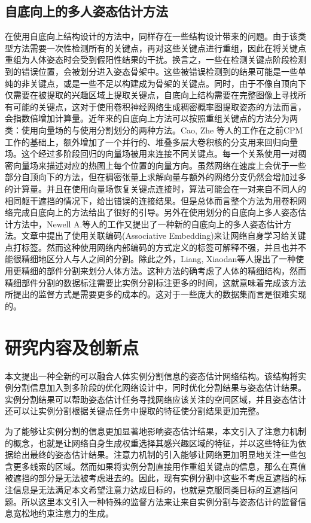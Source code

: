 \subsection{自底向上的多人姿态估计方法}
\label{subsec:bottomup}
在使用自底向上结构设计的方法中，同样存在一些结构设计带来的问题。由于该类型方法需要一次性检测所有的关键点，再对这些关键点进行重组，因此在将关键点重组为人体姿态时会受到假阳性结果的干扰。换言之，一些在检测关键点阶段检测到的错误位置，会被划分进入姿态骨架中。这些被错误检测到的结果可能是一些单纯的非关键点，或是一些不足以构建成为骨架的关键点。同时，由于不像自顶向下仅需要在被提取的兴趣区域上提取关键点，自底向上结构需要在完整图像上寻找所有可能的关键点，这对于使用卷积神经网络生成稠密概率图提取姿态的方法而言，会指数倍增加计算量。近年来的自底向上方法可以按照重组关键点的方法分为两类：使用向量场的与使用分割划分的两种方法。Cao, Zhe 等人的工作\cite{Cao2016Realtime}在之前CPM工作的基础上，额外增加了一个并行的、堆叠多层大卷积核的分支用来回归向量场。这个经过多阶段回归的向量场被用来连接不同关键点。每一个关系使用一对稠密向量场来描述对应的热图上每个位置的向量方向。虽然网络在速度上会优于一些部分自顶向下的方法，但在稠密张量上求解向量与额外的网络分支仍然会增加过多的计算量。并且在使用向量场恢复关键点连接时，算法可能会在一对来自不同人的相同躯干遮挡的情况下，给出错误的连接结果。但是总体而言整个方法为用卷积网络完成自底向上的方法给出了很好的引导。另外在使用划分的自底向上多人姿态估计方法中，Newell A.等人的工作\cite{Newell2017Associative}又提出了一种新的自底向上的多人姿态估计方法。文章中提出了使用关联编码(Associative Embedding)来让网络自身学习给关键点打标签。然而这种使用网络内部编码的方式定义的标签可解释不强，并且也并不能很精细地区分人与人之间的分割。除此之外，Liang, Xiaodan等人提出了一种使用更精细的部件分割来划分人体方法\cite{liang2019look}。这种方法的确考虑了人体的精细结构，然而精细部件分割的数据标注需要比实例分割标注更多的时间，这就意味着完成该方法所提出的监督方式是需要更多的成本的。这对于一些庞大的数据集而言是很难实现的。

\section{研究内容及创新点}
\label{sec:contribution}
本文提出一种全新的可以融合人体实例分割信息的姿态估计网络结构。该结构将实例分割信息加入到多阶段的优化网络设计中，同时优化分割结果与姿态估计结果。实例分割结果可以帮助姿态估计任务寻找网络应该关注的空间区域，并且姿态估计还可以让实例分割根据关键点任务中提取的特征使分割结果更加完整。

为了能够让实例分割的信息更加显著地影响姿态估计结果，本文引入了注意力机制的概念，也就是让网络自身生成权重选择其感兴趣区域的特征，并以这些特征为依据给出最终的姿态估计结果。注意力机制的引入能够让网络更加明显地关注一些包含更多线索的区域。然而如果将实例分割直接用作重组关键点的信息，那么在真值被遮挡的部分是无法被考虑进去的。因此，现有实例分割中这些不考虑互遮挡的标注信息是无法满足本文希望注意力达成目标的，也就是克服同类目标的互遮挡问题。所以这里本文引入一种特殊的监督方法来让来自实例分割与姿态估计的监督信息宽松地约束注意力的生成。

